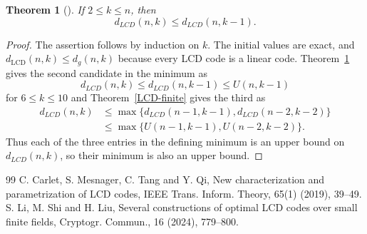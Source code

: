 \documentclass[10pt,a4paper]{amsart}
\newtheorem{theorem}{Theorem}
\begin{document}
\begin{theorem}[\cite{CMTQ-2019}]\label{CMTQ-2019}
    If $2 \leq k \leq n$, then
    \[
    d_{LCD}(n,k) \leq d_{LCD}(n, k-1).
    \]
\end{theorem}

\begin{proof}
The assertion follows by induction on $k$.  The initial values are exact,
and $d_{\mathrm{LCD}}(n,k)\le d_{g}(n,k)$ because every LCD
code is a linear code. Theorem~\ref{CMTQ-2019} gives the second candidate
in the minimum as
\[
d_{LCD}(n, k)\le d_{LCD}(n, k-1)\le U(n, k-1)
\]
for $6\le k\le 10$ and Theorem~\ref{LCD-finite} gives the third as
\[
\begin{aligned}
d_{LCD}(n,k)
&\leq \max\{d_{LCD}(n-1,k-1),
             d_{LCD}(n-2,k-2)\}\\
&\leq \max\{U(n-1,k-1),U(n-2,k-2)\}.
\end{aligned}
\]
Thus each of the three entries in the defining minimum is an upper bound
on $d_{LCD}(n,k)$, so their minimum is also an upper bound.
\end{proof}

\begin{thebibliography}{99}
 \newblock C. Carlet, S. Mesnager, C. Tang and Y. Qi, \newblock New characterization and parametrization of LCD codes, \newblock IEEE Trans. Inform. Theory, 65(1) (2019), 39--49.
 \newblock S. Li, M. Shi and H. Liu, \newblock Several constructions of optimal LCD codes over small finite fields, \newblock Cryptogr. Commun., 16 (2024), 779--800.
\end{thebibliography}
\end{document}
